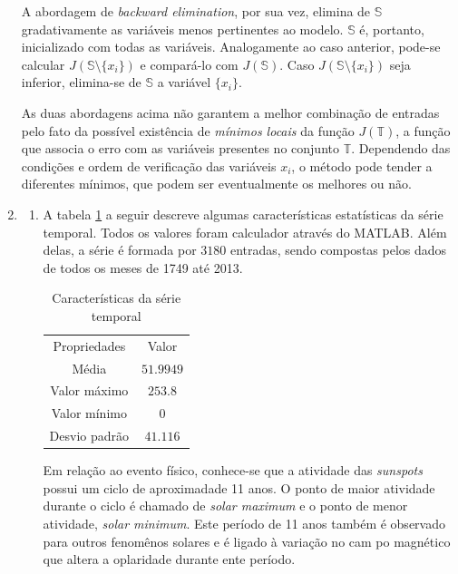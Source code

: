 \begin{enumerate}
			  A abordagem de  \textit{backward elimination}, por sua vez, elimina de \(\mathbb{S}\)
			  gradativamente as variáveis menos pertinentes ao modelo. \(\mathbb{S}\) é, portanto,
			  inicializado com todas as variáveis. Analogamente ao caso anterior, pode-se
			  calcular \(J\left(\mathbb{S} \setminus \{ x_i \} \right)\) e compará-lo com
			  \(J\left(\mathbb{S}\right)\). Caso \(J\left(\mathbb{S} \setminus \{ x_i \} \right)\) seja
			  inferior, elimina-se de \(\mathbb{S}\) a variável \(\{x_i\}\).
			  
			  As duas abordagens acima não garantem a melhor combinação de entradas pelo
			  fato da possível existência de \textit{mínimos locais} da função
			  \(J(\mathbb{T})\), a função que associa o erro com as variáveis presentes no
			  conjunto \(\mathbb{T}\). Dependendo das condições e ordem de verificação das
			  variáveis \(x_i\), o método pode tender a diferentes mínimos, que podem ser
			  eventualmente os melhores ou não.
			
			
			  \item \begin{enumerate}
			    \item A tabela \ref{tab:estat_tab} a seguir descreve algumas características estatísticas da série temporal. Todos os valores foram calculador através do MATLAB. Além delas, a série é formada por \(3180\) entradas, sendo compostas pelos dados de todos os meses de 1749 até 2013. 
			    
			    \begin{table}[h]
				    \centering
					\caption{\label{tab:estat_tab} Características da série temporal}
					\begin{tabular}{|c | c |}
						\hline
						Propriedades & Valor \\	\hhline{|=|=|}
						Média & \(51.9949\) \\ \hline 
						Valor máximo & \(253.8\) \\ \hline 
						Valor mínimo & \(0\) \\ \hline 			
						Desvio padrão & \(41.116\) \\ \hline 			
					\end{tabular}	    
			    \end{table}    
			    
			    Em relação ao evento físico, conhece-se que a atividade das \textit{sunspots} possui um ciclo de aproximadade 11 anos.  O ponto de maior atividade durante o ciclo é chamado de \textit{solar maximum} e o ponto de menor atividade, \textit{solar minimum}. Este período de 11 anos também é observado para outros fenomênos solares e é ligado à variação no cam po magnético que altera a oplaridade durante ente período.


\end{enumerate}
\end{enumerate}

